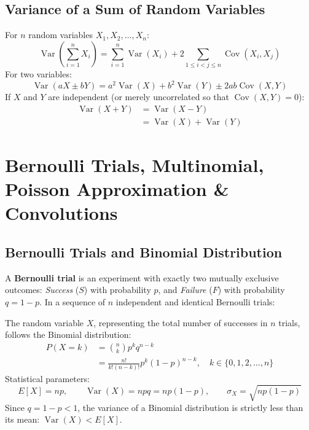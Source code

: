 \documentclass[12pt,a4paper]{article}
\begin{document}
\subsection{Variance of a Sum of Random Variables}
For $n$ random variables $X_1, X_2, \dots, X_n$:
\begin{equation}
  \operatorname{Var}\left(\sum_{i=1}^n X_i\right) = \sum_{i=1}^n \operatorname{Var}(X_i) + 2 \sum_{1 \le i < j \le n} \operatorname{Cov}(X_i, X_j)
\end{equation}
For two variables:
\begin{equation}
  \operatorname{Var}(aX \pm bY) = a^2 \operatorname{Var}(X) + b^2 \operatorname{Var}(Y) \pm 2ab \operatorname{Cov}(X, Y)
\end{equation}
If $X$ and $Y$ are independent (or merely uncorrelated so that $\operatorname{Cov}(X,Y) = 0$):
\begin{equation}
  \begin{aligned}
    \operatorname{Var}(X + Y) &= \operatorname{Var}(X - Y) \\[3pt]
    &= \operatorname{Var}(X) + \operatorname{Var}(Y)
  \end{aligned}
\end{equation}

\section{Bernoulli Trials, Multinomial, Poisson Approximation \& Convolutions}

\subsection{Bernoulli Trials and Binomial Distribution}
A \textbf{Bernoulli trial} is an experiment with exactly two mutually exclusive outcomes: \textit{Success} ($S$) with probability $p$, and \textit{Failure} ($F$) with probability $q = 1 - p$.
In a sequence of $n$ independent and identical Bernoulli trials:
\begin{tcolorbox}[formulabox, title={\textbf{Binomial Distribution $\mathbf{Bin(n, p)}$}}]
The random variable $X$, representing the total number of successes in $n$ trials, follows the Binomial distribution:
\begin{equation}
  \begin{aligned}
    P(X = k) &= \binom{n}{k} p^k q^{n-k} \\[3pt]
    &= \frac{n!}{k!(n-k)!} p^k (1-p)^{n-k}, \quad k \in \{0, 1, 2, \dots, n\}
  \end{aligned}
\end{equation}
Statistical parameters:
\begin{equation}
  E[X] = np, \qquad \operatorname{Var}(X) = npq = np(1-p), \qquad \sigma_X = \sqrt{np(1-p)}
\end{equation}
Since $q = 1-p < 1$, the variance of a Binomial distribution is strictly less than its mean: $\operatorname{Var}(X) < E[X]$.
\end{tcolorbox}
\end{document}
